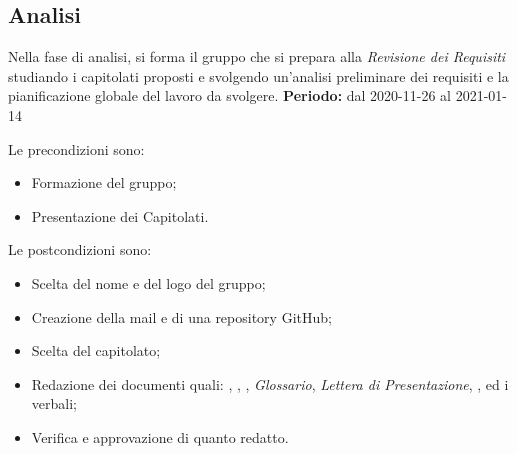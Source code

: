 \subsection{Analisi}
\label{analisi}
Nella fase di analisi, si forma il gruppo che si prepara alla \textit{Revisione dei Requisiti} studiando i capitolati proposti e svolgendo un'analisi preliminare dei requisiti e la pianificazione globale del lavoro da svolgere.
\textbf{Periodo:} dal 2020-11-26 al 2021-01-14

Le precondizioni sono:
\begin{itemize}
    \item Formazione del gruppo;
    \item Presentazione dei Capitolati.
\end{itemize}

Le postcondizioni sono:
\begin{itemize}
    \item Scelta del nome e del logo del gruppo;
    \item Creazione della mail e di una repository GitHub;
    \item Scelta del capitolato;
    \item Redazione dei documenti quali: \textit{\SdF}, \textit{\NdP}, \textit{\PdP}, \textit{Glossario}, \textit{Lettera di Presentazione}, \textit{\PdQ}, \textit{\AdR} ed i verbali;
    \item Verifica e approvazione di quanto redatto.
\end{itemize}

